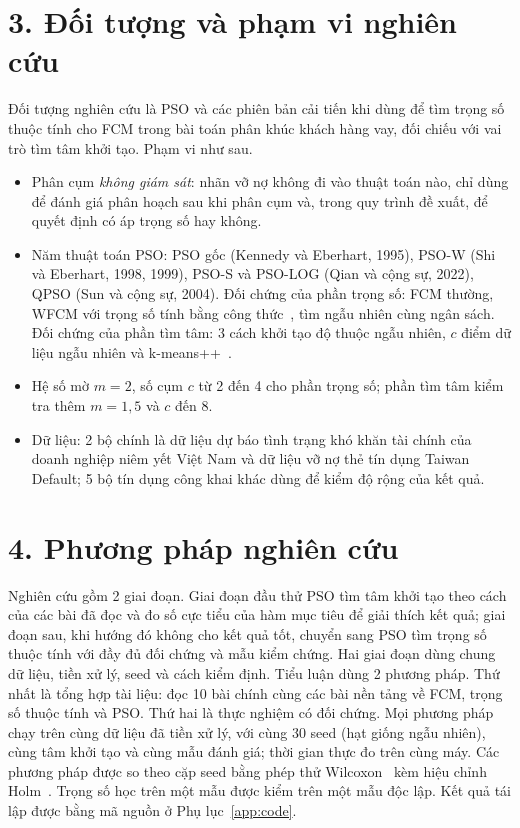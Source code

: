 \section*{3. Đối tượng và phạm vi nghiên cứu}

Đối tượng nghiên cứu là PSO và các phiên bản cải tiến khi dùng để tìm trọng số thuộc tính cho FCM trong bài toán phân khúc
khách hàng vay, đối chiếu với vai trò tìm tâm khởi tạo. Phạm vi như sau.
\begin{itemize}
  \item Phân cụm \emph{không giám sát}: nhãn vỡ nợ không đi vào thuật toán nào, chỉ dùng để đánh giá phân hoạch sau khi phân
  cụm và, trong quy trình đề xuất, để quyết định có áp trọng số hay không.
  \item Năm thuật toán PSO: PSO gốc (Kennedy và Eberhart, 1995), PSO-W (Shi và Eberhart, 1998, 1999), PSO-S và PSO-LOG (Qian và
  cộng sự, 2022), QPSO (Sun và cộng sự, 2004). Đối chứng của phần trọng số: FCM thường, WFCM với trọng số tính bằng công
  thức~\cite{keller2000weighting}, tìm ngẫu nhiên cùng ngân sách. Đối chứng của phần tìm tâm: 3 cách khởi tạo độ thuộc ngẫu
  nhiên, $c$ điểm dữ liệu ngẫu nhiên và k-means++~\cite{arthur2007kmeanspp}.
  \item Hệ số mờ $m = 2$, số cụm $c$ từ 2 đến 4 cho phần trọng số; phần tìm tâm kiểm tra thêm $m = 1{,}5$ và $c$ đến 8.
  \item Dữ liệu: 2 bộ chính là dữ liệu dự báo tình trạng khó khăn tài chính của doanh nghiệp niêm yết Việt Nam và dữ liệu vỡ nợ thẻ tín
  dụng Taiwan Default; 5 bộ tín dụng công khai khác dùng để kiểm độ rộng của kết quả.
\end{itemize}

\section*{4. Phương pháp nghiên cứu}

Nghiên cứu gồm 2 giai đoạn. Giai đoạn đầu thử PSO tìm tâm khởi tạo theo cách của các bài đã đọc và đo số
cực tiểu của hàm mục tiêu để giải thích kết quả; giai đoạn sau, khi hướng đó không cho kết quả tốt, chuyển sang PSO tìm trọng
số thuộc tính với đầy đủ đối chứng và mẫu kiểm chứng. Hai giai đoạn dùng chung dữ liệu, tiền xử lý, seed và cách kiểm định.
Tiểu luận dùng 2 phương pháp. Thứ nhất là tổng hợp tài liệu: đọc 10 bài chính cùng các bài
nền tảng về FCM, trọng số thuộc tính và PSO. Thứ hai là thực nghiệm có đối chứng. Mọi phương pháp chạy trên cùng dữ liệu đã
tiền xử lý, với cùng 30 seed (hạt giống ngẫu nhiên), cùng tâm khởi tạo và cùng mẫu đánh giá; thời gian thực đo trên cùng máy.
Các phương pháp được so theo cặp seed bằng phép thử Wilcoxon~\cite{wilcoxon1945} kèm hiệu chỉnh Holm~\cite{holm1979}. Trọng
số học trên một mẫu được kiểm trên một mẫu độc lập. Kết quả tái lập được bằng mã nguồn ở Phụ lục~\ref{app:code}.

